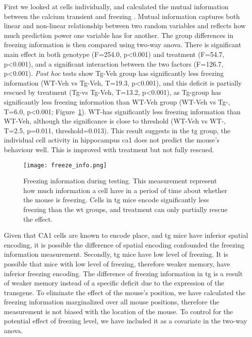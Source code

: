 First we looked at cells individually, and calculated the mutual information between the calcium transient and freezing \citep{ross14, victor02}. Mutual information captures both linear and non-linear relationship between two random variables and reflects how much prediction power one variable has for another. The group differences in freezing information is then compared using two-way \gls{anova}. There is significant main effect in both genotype (F=254.0, p<0.001) and treatment (F=54.7, p<0.001), and a significant interaction between the two factors (F=126.7, p<0.001). \textit{Post hoc} tests show Tg-Veh group has significantly less freezing information (WT-Veh vs Tg-Veh, T=19.3, p<0.001), and this deficit is partially rescued by \tglu treatment (Tg-\glu vs Tg-Veh, T=13.2, p<0.001), as Tg-\glu group has significantly less freezing information than WT-Veh group (WT-Veh vs Tg-\glu, T=6.0, p<0.001; Figure~\ref{f.ad.freeze_info}). WT-\glu has significantly less freezing information than WT-Veh, although the significance is close to threshold (WT-Veh vs WT-\glu, T=2.5, p=0.011, threshold=0.013). This result suggests in the \gls{tg} group, the individual cell activity in hippocampus \gls{ca1} does not predict the mouse's behaviour well. This is improved with \tglu treatment but not fully rescued. 
\begin{figure}[h]
    \texttt{[image: freeze\_info.png]}
    \caption{Freezing information during testing. This measurement represent how much information a cell have in a period of time about whether the mouse is freezing. Cells in \gls{tg} mice encode significantly less freezing than the \gls{wt} groups, and \tglu treatment can only partially rescue the effect. \label{f.ad.freeze_info}}
\end{figure}
    


Given that CA1 cells are known to encode place, and \gls{tg} mice have inferior spatial encoding, it is possible the difference of spatial encoding confounded the freezing information measurement. Secondly, \gls{tg} mice have low level of freezing. It is possible that mice with low level of freezing, therefore weaker memory, have inferior freezing encoding. The difference of freezing information in \gls{tg} is a result of weaker memory instead of a specific deficit due to the expression of the transgene. To eliminate the effect of the mouse's position, we have calculated the freezing information marginalized over all mouse positions, therefore the measurement is not biased with the location of the mouse. To control for the potential effect of freezing level, we have included it as a covariate in the two-way \gls{anova}. 

